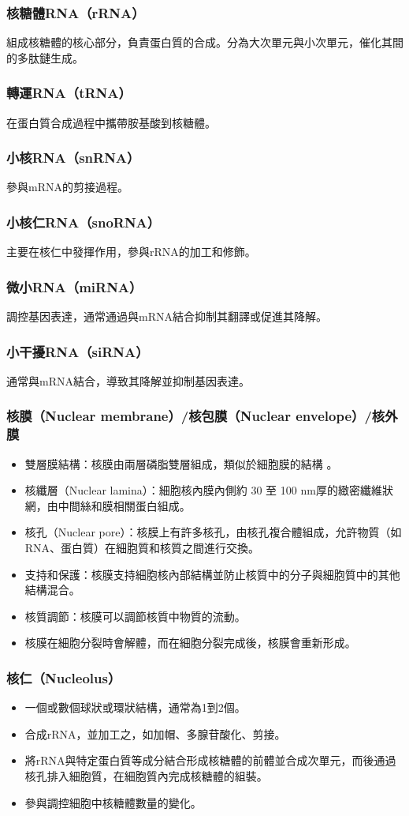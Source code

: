 \documentclass[a4paper,12pt]{report}
\begin{document}
\subsubsection{核糖體RNA（rRNA）}
組成核糖體的核心部分，負責蛋白質的合成。分為大次單元與小次單元，催化其間的多肽鏈生成。
\subsubsection{轉運RNA（tRNA）}
在蛋白質合成過程中攜帶胺基酸到核糖體。
\subsubsection{小核RNA（snRNA）}
參與mRNA的剪接過程。
\subsubsection{小核仁RNA（snoRNA）}
主要在核仁中發揮作用，參與rRNA的加工和修飾。
\subsubsection{微小RNA（miRNA）}
調控基因表達，通常通過與mRNA結合抑制其翻譯或促進其降解。
\subsubsection{小干擾RNA（siRNA）}
通常與mRNA結合，導致其降解並抑制基因表達。
\subsubsection{核膜（Nuclear membrane）/核包膜（Nuclear envelope）/核外膜}
\begin{itemize}
  \item 雙層膜結構：核膜由兩層磷脂雙層組成，類似於細胞膜的結構 。
  \item 核纖層（Nuclear lamina）：細胞核內膜內側約 30 至 100  nm厚的緻密纖維狀網，由中間絲和膜相關蛋白組成。
  \item 核孔（Nuclear pore）：核膜上有許多核孔，由核孔複合體組成，允許物質（如RNA、蛋白質）在細胞質和核質之間進行交換。
  \item 支持和保護：核膜支持細胞核內部結構並防止核質中的分子與細胞質中的其他結構混合。
  \item 核質調節：核膜可以調節核質中物質的流動。
  \item 核膜在細胞分裂時會解體，而在細胞分裂完成後，核膜會重新形成。
\end{itemize}
\subsubsection{核仁（Nucleolus）}
\begin{itemize}
  \item 一個或數個球狀或環狀結構，通常為1到2個。
  \item 合成rRNA，並加工之，如加帽、多腺苷酸化、剪接。
  \item 將rRNA與特定蛋白質等成分結合形成核糖體的前體並合成次單元，而後通過核孔排入細胞質，在細胞質內完成核糖體的組裝。
  \item 參與調控細胞中核糖體數量的變化。
\end{itemize}
\end{document}
